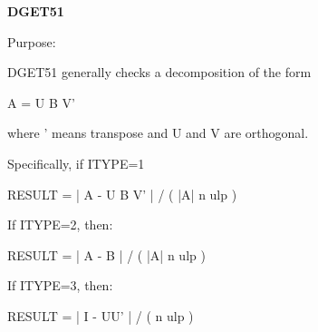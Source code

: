 {\bfseries D\+G\+E\+T51} 

\begin{DoxyParagraph}{Purpose\+: }
\begin{DoxyVerb}      DGET51  generally checks a decomposition of the form

              A = U B V'

      where ' means transpose and U and V are orthogonal.

      Specifically, if ITYPE=1

              RESULT = | A - U B V' | / ( |A| n ulp )

      If ITYPE=2, then:

              RESULT = | A - B | / ( |A| n ulp )

      If ITYPE=3, then:

              RESULT = | I - UU' | / ( n ulp )\end{DoxyVerb}
 
\end{DoxyParagraph}

